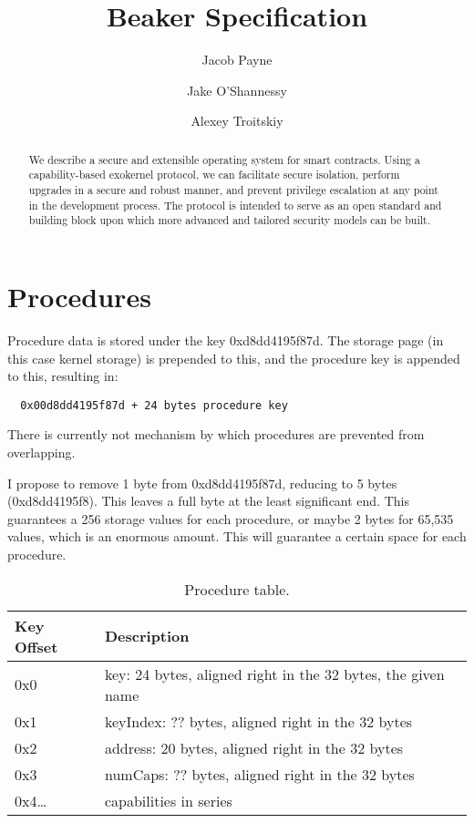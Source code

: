 \documentclass[english,a4paper]{article}
\title{Beaker Specification}\label{beaker-specification}
\author{Jacob Payne \and Jake O'Shannessy \and Alexey Troitskiy}
\begin{document}
\maketitle

\begin{abstract}\label{abstract}

We describe a secure and extensible operating system for smart contracts. Using
a capability-based exokernel protocol, we can facilitate secure isolation,
perform upgrades in a secure and robust manner, and prevent privilege escalation
at any point in the development process. The protocol is intended to serve as an open
standard and building block upon which more advanced and tailored security
models can be built.

\end{abstract}

\newpage
\tableofcontents
\newpage

\section{Procedures}\label{procedures}
Procedure data is stored under the key 0xd8dd4195f87d. The storage page (in this
case kernel storage) is prepended to this, and the procedure key is appended to
this, resulting in:

\begin{verbatim}
  0x00d8dd4195f87d + 24 bytes procedure key
\end{verbatim}

There is currently not mechanism by which procedures are prevented from
overlapping.

I propose to remove 1 byte from 0xd8dd4195f87d, reducing to 5 bytes
(0xd8dd4195f8). This leaves a full byte at the least significant end. This
guarantees a 256 storage values for each procedure, or maybe 2 bytes for 65,535
values, which is an enormous amount. This will guarantee a certain space for
each procedure.

\begin{table}[H]
  \caption{Procedure table.}
  \centering{}%
  \begin{tabular}{l|p{}}
    \hline
    Key Offset & Description\tabularnewline
    \hline
    \hline
    0x0       & key: 24 bytes, aligned right in the 32 bytes, the given
      name \tabularnewline
    0x1       & keyIndex: ?? bytes, aligned right in the 32 bytes
      \tabularnewline
    0x2       & address: 20 bytes, aligned right in the 32 bytes \tabularnewline
    0x3       & numCaps: ?? bytes, aligned right in the 32 bytes \tabularnewline
    0x4\ldots & capabilities in series \tabularnewline
    \hline
  \end{tabular}
\end{table}
\end{document}
